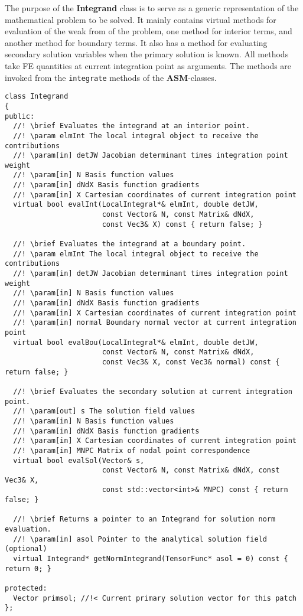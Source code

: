 \documentclass{article}
\begin{document}
The purpose of the {\bf Integrand} class is to serve as a generic representation
of the mathematical problem to be solved.
It mainly contains virtual methods for evaluation of the weak from of the problem,
one method for interior terms, and another method for boundary terms.
It also has a method for evaluating secondary solution variables when the primary
solution is known.
All methods take FE quantities at current integration point as arguments.
The methods are invoked from the {\tt integrate} methods of the {\bf ASM}-classes.

{\small\begin{verbatim}
class Integrand
{
public:
  //! \brief Evaluates the integrand at an interior point.
  //! \param elmInt The local integral object to receive the contributions
  //! \param[in] detJW Jacobian determinant times integration point weight
  //! \param[in] N Basis function values
  //! \param[in] dNdX Basis function gradients
  //! \param[in] X Cartesian coordinates of current integration point
  virtual bool evalInt(LocalIntegral*& elmInt, double detJW,
                       const Vector& N, const Matrix& dNdX,
                       const Vec3& X) const { return false; }

  //! \brief Evaluates the integrand at a boundary point.
  //! \param elmInt The local integral object to receive the contributions
  //! \param[in] detJW Jacobian determinant times integration point weight
  //! \param[in] N Basis function values
  //! \param[in] dNdX Basis function gradients
  //! \param[in] X Cartesian coordinates of current integration point
  //! \param[in] normal Boundary normal vector at current integration point
  virtual bool evalBou(LocalIntegral*& elmInt, double detJW,
                       const Vector& N, const Matrix& dNdX,
                       const Vec3& X, const Vec3& normal) const { return false; }

  //! \brief Evaluates the secondary solution at current integration point.
  //! \param[out] s The solution field values
  //! \param[in] N Basis function values
  //! \param[in] dNdX Basis function gradients
  //! \param[in] X Cartesian coordinates of current integration point
  //! \param[in] MNPC Matrix of nodal point correspondence
  virtual bool evalSol(Vector& s,
                       const Vector& N, const Matrix& dNdX, const Vec3& X,
                       const std::vector<int>& MNPC) const { return false; }

  //! \brief Returns a pointer to an Integrand for solution norm evaluation.
  //! \param[in] asol Pointer to the analytical solution field (optional)
  virtual Integrand* getNormIntegrand(TensorFunc* asol = 0) const { return 0; }

protected:
  Vector primsol; //!< Current primary solution vector for this patch
};
\end{verbatim}}
\end{document}
